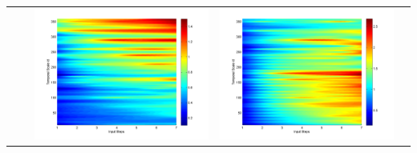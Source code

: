 \documentclass[11pt]{article}
\begin{document}
\begin{table}[H]
{\begin{tabular}{ccccc}
&&\begin{minipage}{.3\textwidth}\includegraphics[width=\linewidth]{resultgraph/02143000p.png}\end{minipage}
&\begin{minipage}{.3\textwidth}\includegraphics[width=\linewidth]{resultgraph/02143000pep.png}\end{minipage}

\end{tabular}}
\end{table}
\end{document}
